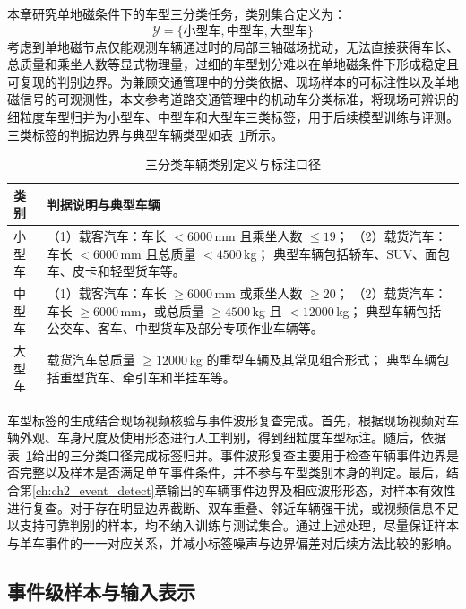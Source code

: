 \documentclass{xdupgthesis}
\begin{document}
本章研究单地磁条件下的车型三分类任务，类别集合定义为：
\begin{equation}
    \mathcal{Y}=\{\text{小型车},\text{中型车},\text{大型车}\}
\end{equation}
考虑到单地磁节点仅能观测车辆通过时的局部三轴磁场扰动，无法直接获得车长、总质量和乘坐人数等显式物理量，过细的车型划分难以在单地磁条件下形成稳定且可复现的判别边界。为兼顾交通管理中的分类依据、现场样本的可标注性以及单地磁信号的可观测性，本文参考道路交通管理中的机动车分类标准\cite{ch3_mps_ga8022019}，将现场可辨识的细粒度车型归并为小型车、中型车和大型车三类标签，用于后续模型训练与评测。三类标签的判据边界与典型车辆类型如表~\ref{tab:ch3_label_rule}所示。

\begin{table}[!htbp]
\centering
\small
\caption{三分类车辆类别定义与标注口径}
\label{tab:ch3_label_rule}
\renewcommand{\arraystretch}{1.25}
\setlength{\tabcolsep}{4pt}
\begin{tabular}{p{2.0cm} p{10.8cm}}
\hline
类别 & 判据说明与典型车辆 \\
\hline
小型车 &
（1）载客汽车：车长 $<6000$\,mm 且乘坐人数 $\le 19$；
（2）载货汽车：车长 $<6000$\,mm 且总质量 $<4500$\,kg；
典型车辆包括轿车、SUV、面包车、皮卡和轻型货车等。\\
中型车 &
（1）载客汽车：车长 $\ge 6000$\,mm 或乘坐人数 $\ge 20$；
（2）载货汽车：车长 $\ge 6000$\,mm，或总质量 $\ge 4500$\,kg 且 $<12000$\,kg；
典型车辆包括公交车、客车、中型货车及部分专项作业车辆等。\\
大型车 &
载货汽车总质量 $\ge 12000$\,kg 的重型车辆及其常见组合形式；
典型车辆包括重型货车、牵引车和半挂车等。\\
\hline
\end{tabular}
\end{table}

车型标签的生成结合现场视频核验与事件波形复查完成。首先，根据现场视频对车辆外观、车身尺度及使用形态进行人工判别，得到细粒度车型标注。随后，依据表~\ref{tab:ch3_label_rule}给出的三分类口径完成标签归并。事件波形复查主要用于检查车辆事件边界是否完整以及样本是否满足单车事件条件，并不参与车型类别本身的判定。最后，结合第\ref{ch:ch2_event_detect}章输出的车辆事件边界及相应波形形态，对样本有效性进行复查。对于存在明显边界截断、双车重叠、邻近车辆强干扰，或视频信息不足以支持可靠判别的样本，均不纳入训练与测试集合。通过上述处理，尽量保证样本与单车事件的一一对应关系，并减小标签噪声与边界偏差对后续方法比较的影响。

\subsection{事件级样本与输入表示}
\label{subsec:ch3_sample_repr}
\end{document}
